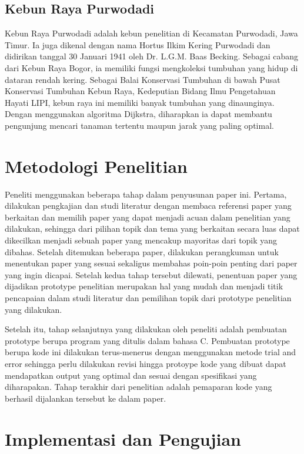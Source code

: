 \documentclass[conference]{IEEEtran}
\begin{document}
\subsection{Kebun Raya Purwodadi}
Kebun Raya Purwodadi adalah kebun penelitian di Kecamatan Purwodadi, Jawa Timur. Ia juga dikenal dengan nama Hortus Ilkim Kering Purwodadi dan didirikan tanggal 30 Januari 1941 oleh Dr. L.G.M. Baas Becking. Sebagai cabang dari Kebun Raya Bogor, ia memiliki fungsi mengkoleksi tumbuhan yang hidup di dataran rendah kering. Sebagai Balai Konservasi Tumbuhan di bawah Pusat Konservasi Tumbuhan Kebun Raya, Kedeputian Bidang Ilmu Pengetahuan Hayati LIPI, kebun raya ini memiliki banyak tumbuhan yang dinaunginya. Dengan menggunakan algoritma Dijkstra, diharapkan ia dapat membantu pengunjung mencari tanaman tertentu maupun jarak yang paling optimal.

\section{Metodologi Penelitian}
Peneliti menggunakan beberapa tahap dalam penyusunan
paper ini. Pertama, dilakukan pengkajian dan studi literatur
dengan membaca referensi paper yang berkaitan dan memilih
paper yang dapat menjadi acuan dalam penelitian yang dilakukan,
sehingga dari pilihan topik dan tema yang berkaitan
secara luas dapat dikecilkan menjadi sebuah paper yang mencakup
mayoritas dari topik yang dibahas. Setelah ditemukan
beberapa paper, dilakukan perangkuman untuk menentukan
paper yang sesuai sekaligus membahas poin-poin penting
dari paper yang ingin dicapai. Setelah kedua tahap tersebut
dilewati, penentuan paper yang dijadikan prototype penelitian
merupakan hal yang mudah dan menjadi titik pencapaian
dalam studi literatur dan pemilihan topik dari prototype penelitian
yang dilakukan.

Setelah itu, tahap selanjutnya yang dilakukan oleh peneliti
adalah pembuatan prototype berupa program yang ditulis
dalam bahasa C. Pembuatan prototype berupa kode ini dilakukan
terus-menerus dengan menggunakan metode trial and
error sehingga perlu dilakukan revisi hingga protoype kode
yang dibuat dapat mendapatkan output yang optimal dan
sesuai dengan spesifikasi yang diharapakan. Tahap terakhir dari penelitian adalah pemaparan kode yang berhasil dijalankan tersebut ke dalam paper.
\begin{figure}[htbp]
    \centering
    \scalebox{0.90}{}
\end{figure}

\section{Implementasi dan Pengujian}
\end{document}
